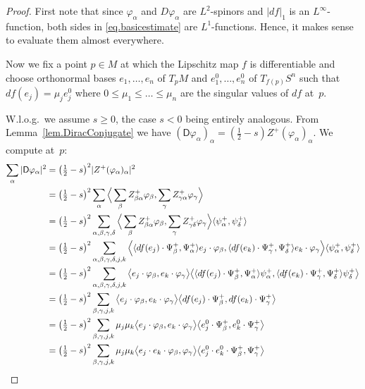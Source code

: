 \documentclass[11pt,reqno]{amsart}
\newcommand{\D}{\mathsf{D}}
\renewcommand{\phi}{\varphi}
\newcommand{\<}{\langle}
\renewcommand{\>}{\rangle}
\theoremstyle{definition}
\begin{document}
\begin{proof}
First note that since $\phi_\alpha$ and $D\phi_\alpha$ are $L^2$-spinors and $|df|_1$ is an $L^\infty$-function, both sides in \eqref{eq.basicestimate} are $L^1$-functions.
Hence, it makes sense to evaluate them almost everywhere.

Now we fix a point $p\in M$ at which the Lipschitz map $f$ is differentiable and choose orthonormal bases $e_1,\dots,e_n$ of $T_pM$ and $e_1^0,\dots,e_n^0$ of $T_{f(p)}S^n$ such that $df(e_j)=\mu_j e_j^0$ where $0\le\mu_1\le\dots\le\mu_n$ are the singular values of $df$ at~$p$.

W.l.o.g.\ we assume $s\ge0$, the case $s<0$ being entirely analogous.
From Lemma~\ref{lem.DiracConjugate} we have $(\D\phi_\alpha)_\alpha = (\frac12-s)Z^+(\phi_\alpha)_\alpha$.
We compute at~$p$:
\begin{align}
\sum_\alpha |\D \phi_\alpha|^2
&=
\big(\tfrac12-s\big)^2|Z^+(\phi_\alpha)_\alpha|^2 \\
&=
\big(\tfrac12-s\big)^2\sum_\alpha \Big\<\sum_\beta Z_{\beta\alpha}^+\phi_\beta, \sum_\gamma Z_{\gamma\alpha}^+\phi_\gamma\Big\> \notag\\
&=
\big(\tfrac12-s\big)^2\sum_{\alpha,\beta,\gamma,\delta} \Big\<\sum_\beta Z_{\beta\alpha}^+\phi_\beta, \sum_\gamma Z_{\gamma\delta}^+\phi_\gamma\Big\>\<\psi_\alpha^+,\psi_\delta^+\> \notag\\
&=
\big(\tfrac12-s\big)^2\sum_{\alpha,\beta,\gamma,\delta,j,k}\Big\< \<df(e_j)\cdot\Psi_\beta^+,\Psi_\alpha^+\>e_j\cdot \phi_\beta , \<df(e_k)\cdot\Psi_\gamma^+,\Psi_\delta^+\>e_k\cdot \phi_\gamma \Big\>\<\psi_\alpha^+,\psi_\delta^+\>\notag\\
&=
\big(\tfrac12-s\big)^2\sum_{\alpha,\beta,\gamma,\delta,j,k}\big\< e_j\cdot \phi_\beta , e_k\cdot \phi_\gamma \big\>\big\<\<df(e_j)\cdot\Psi_\beta^+,\Psi_\alpha^+\>\psi_\alpha^+,\<df(e_k)\cdot\Psi_\gamma^+,\Psi_\delta^+\>\psi_\delta^+\big\>\notag\\
&=
\big(\tfrac12-s\big)^2\sum_{\beta,\gamma,j,k}\big\< e_j\cdot \phi_\beta , e_k\cdot \phi_\gamma \big\>\big\<df(e_j)\cdot\Psi_\beta^+,df(e_k)\cdot\Psi_\gamma^+\big\>\notag\\
&=
\big(\tfrac12-s\big)^2\sum_{\beta,\gamma,j,k}\mu_j\mu_k\big\< e_j\cdot \phi_\beta , e_k\cdot \phi_\gamma \big\>\big\<e^0_j\cdot\Psi_\beta^+,e^0_k\cdot\Psi_\gamma^+\big\>\notag\\
&=
\big(\tfrac12-s\big)^2\sum_{\beta,\gamma,j,k}\mu_j\mu_k\big\< e_j\cdot e_k\cdot \phi_\beta , \phi_\gamma \big\>\big\<e^0_j\cdot e^0_k\cdot\Psi_\beta^+,\Psi_\gamma^+\big\>\notag\\

\end{align}
\end{proof}
\end{document}
